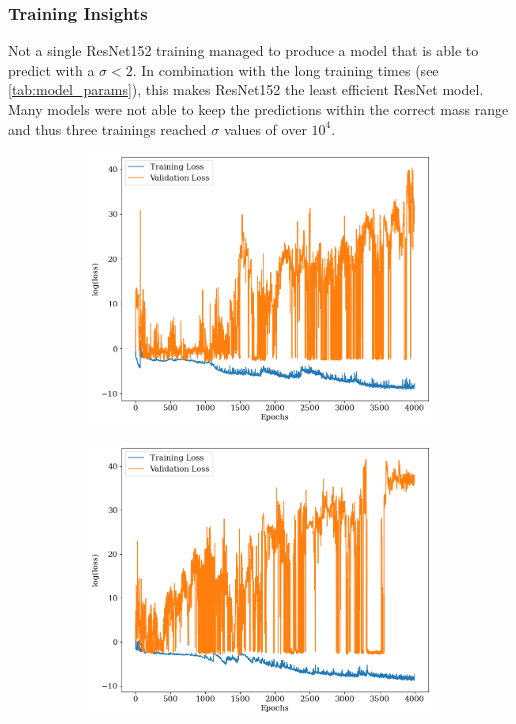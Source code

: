 \subsubsection*{Training Insights}
Not a single ResNet152 training managed to produce a model that is able to predict with a $\sigma < 2$. In combination with the long training times (see \autoref{tab:model_params}), this makes ResNet152 the least efficient ResNet model. Many models were not able to keep the predictions within the correct mass range and thus three trainings reached $\sigma$ values of over $10^4$.

\begin{figure}[H]
\centering
\begin{subfigure}{.46\textwidth}
\centering
\includegraphics[width=\textwidth]{images/Chapter4/Res152/res152_bad_1.png}
\caption{} 
\label{fig:res152_bad_a}
\end{subfigure}
\hspace{.6em}
\begin{subfigure}{.46\textwidth}
\centering
\includegraphics[width=\textwidth]{images/Chapter4/Res152/res152_bad_2.png}

\end{subfigure}
\end{figure}
